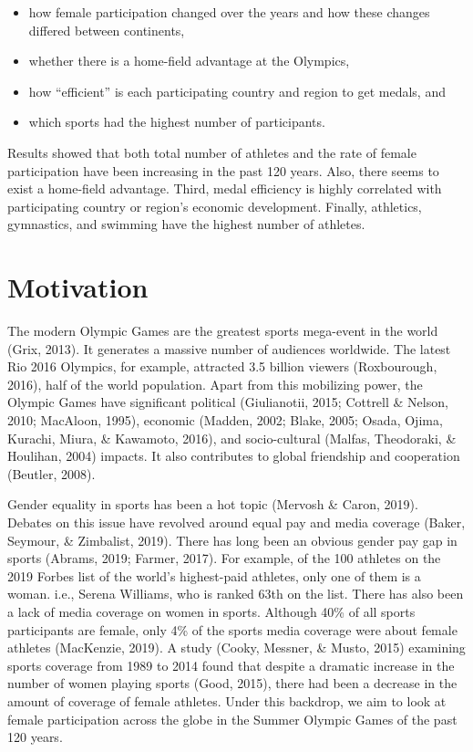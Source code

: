 \documentclass[
]{article}
\begin{document}
\begin{itemize}
\item
  how female participation changed over the years and how these changes differed between continents,
\item
  whether there is a home-field advantage at the Olympics,
\item
  how ``efficient'' is each participating country and region to get medals, and
\item
  which sports had the highest number of participants.
\end{itemize}

Results showed that both total number of athletes and the rate of female participation have been increasing in the past 120 years. Also, there seems to exist a home-field advantage. Third, medal efficiency is highly correlated with participating country or region's economic development. Finally, athletics, gymnastics, and swimming have the highest number of athletes.

\hypertarget{motivation}{%
\section{Motivation}\label{motivation}}

The modern Olympic Games are the greatest sports mega-event in the world (Grix, 2013). It generates a massive number of audiences worldwide. The latest Rio 2016 Olympics, for example, attracted 3.5 billion viewers (Roxbourough, 2016), half of the world population. Apart from this mobilizing power, the Olympic Games have significant political (Giulianotii, 2015; Cottrell \& Nelson, 2010; MacAloon, 1995), economic (Madden, 2002; Blake, 2005; Osada, Ojima, Kurachi, Miura, \& Kawamoto, 2016), and socio-cultural (Malfas, Theodoraki, \& Houlihan, 2004) impacts. It also contributes to global friendship and cooperation (Beutler, 2008).

Gender equality in sports has been a hot topic (Mervosh \& Caron, 2019). Debates on this issue have revolved around equal pay and media coverage (Baker, Seymour, \& Zimbalist, 2019). There has long been an obvious gender pay gap in sports (Abrams, 2019; Farmer, 2017). For example, of the 100 athletes on the 2019 Forbes list of the world's highest-paid athletes, only one of them is a woman. i.e., Serena Williams, who is ranked 63th on the list. There has also been a lack of media coverage on women in sports. Although 40\% of all sports participants are female, only 4\% of the sports media coverage were about female athletes (MacKenzie, 2019). A study (Cooky, Messner, \& Musto, 2015) examining sports coverage from 1989 to 2014 found that despite a dramatic increase in the number of women playing sports (Good, 2015), there had been a decrease in the amount of coverage of female athletes. Under this backdrop, we aim to look at female participation across the globe in the Summer Olympic Games of the past 120 years.
\end{document}
